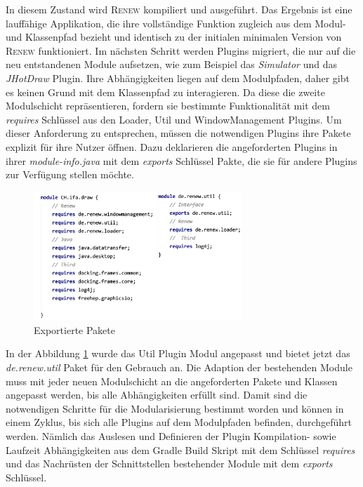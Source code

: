 	In diesem Zustand wird \textsc{Renew} kompiliert und ausgeführt. Das Ergebnis ist eine lauffähige Applikation, die ihre vollständige Funktion zugleich aus dem Modul- und Klassenpfad bezieht und identisch zu der initialen minimalen Version von \textsc{Renew} funktioniert.\newline
	Im nächsten Schritt werden Plugins migriert, die nur auf die neu entstandenen Module aufsetzen, wie zum Beispiel das \textit{Simulator} und das \textit{JHotDraw} Plugin. Ihre Abhängigkeiten liegen auf dem Modulpfaden, daher gibt es keinen Grund mit dem Klassenpfad zu interagieren. \newline
	Da diese die zweite Modulschicht repräsentieren, fordern sie bestimmte Funktionalität mit dem \textit{requires} Schlüssel aus den Loader, Util und WindowManagement Plugins. Um dieser Anforderung zu entsprechen, müssen die notwendigen Plugins ihre Pakete  explizit für ihre Nutzer öffnen. Dazu deklarieren die angeforderten Plugins in ihrer \textit{module-info.java} mit dem \textit{exports} Schlüssel Pakte, die sie für andere Plugins zur Verfügung stellen möchte.

	\begin{figure}[h!]
	  \centering
	  \includegraphics[width=0.7\textwidth]{material/images/utilCH-info.png}
	  \caption{Exportierte Pakete}
	  \label{fig:utilCH}
	\end{figure}

	In der Abbildung \ref{fig:utilCH} wurde das Util Plugin Modul angepasst und bietet jetzt das \textit{de.renew.util} Paket für den Gebrauch an.\newline
	Die Adaption der bestehenden Module muss mit jeder neuen Modulschicht an die angeforderten Pakete und Klassen angepasst werden, bis alle Abhängigkeiten erfüllt sind.\newline
	Damit sind die notwendigen Schritte für die Modularisierung bestimmt worden und können in einem Zyklus, bis sich alle Plugins auf dem Modulpfaden befinden, durchgeführt werden. Nämlich das Auslesen und Definieren der Plugin Kompilation- sowie Laufzeit Abhängigkeiten aus dem Gradle Build Skript mit dem Schlüssel \textit{requires} und das Nachrüsten der Schnittstellen bestehender Module mit dem \textit{exports} Schlüssel. \bigbreak

